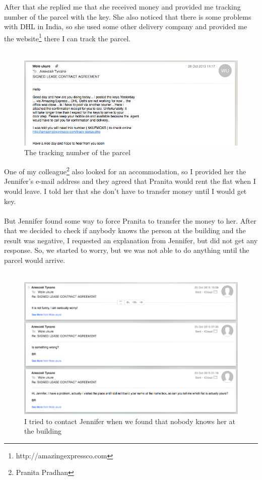\documentclass[english]{article}
\begin{document}
After that she replied me that she received money and provided me tracking number of the parcel with the key. She also noticed that there is some problems with DHL in India, so she used some other delivery company and provided me the website\footnote{http://amazingexpressco.com} there I can track the parcel.\\\\

\begin{figure}[H]
\centerline{\includegraphics[scale=0.4]{st/5}}
\caption{The tracking number of the parcel}
\end{figure}

One of my colleague\footnote{Pranita Pradhan} also looked for an accommodation, so I provided her the Jennifer's e-mail address and they agreed that Pranita would rent the flat when I would leave. I told her that she don't have to transfer money until I would get key.\\\\

But Jennifer found some way to force Pranita to transfer the money to her. After that we decided to check if anybody knows the person at the building and the result was negative, I requested an explanation from Jennifer, but did not get any response. So, we started to worry, but we was not able to do anything until the parcel would arrive.\\\\

\begin{figure}[H]
\centerline{\includegraphics[scale=0.4]{st/6}}
\caption{I tried to contact Jennifer when we found that nobody knows her at the building}
\end{figure}
\end{document}
